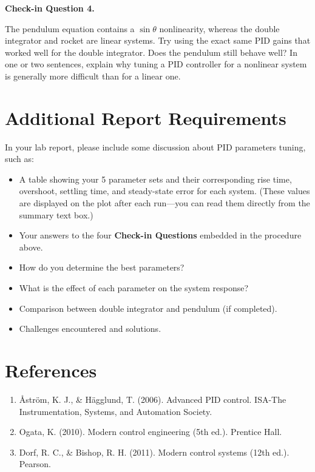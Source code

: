 \documentclass[12pt]{article}
\newenvironment{enroutequestion}[1]{%
    \begin{mdframed}[linewidth=1pt, linecolor=blue!60, backgroundcolor=blue!5,
                     innertopmargin=8pt, innerbottommargin=8pt,
                     innerleftmargin=10pt, innerrightmargin=10pt]
    \noindent\textbf{Check-in Question #1.}~\itshape
}{%
    \end{mdframed}
}
\begin{document}
\begin{enroutequestion}{4}
The pendulum equation contains a $\sin\theta$ nonlinearity, whereas the double integrator and rocket are linear systems.  Try using the exact same PID gains that worked well for the double integrator.  Does the pendulum still behave well?  In one or two sentences, explain why tuning a PID controller for a nonlinear system is generally more difficult than for a linear one.
\end{enroutequestion}

\section{Additional Report Requirements}

In your lab report, please include some discussion about PID parameters tuning, such as:
\begin{itemize}
    \item A table showing your 5 parameter sets and their corresponding rise time, overshoot, settling time, and steady-state error for each system.  (These values are displayed on the plot after each run---you can read them directly from the summary text box.)
    \item Your answers to the four \textbf{Check-in Questions} embedded in the procedure above.
    \item How do you determine the best parameters?  
    \item What is the effect of each parameter on the system response?  
    \item Comparison between double integrator and pendulum (if completed). 
    \item Challenges encountered and solutions. 
\end{itemize}

\section{References}

\begin{enumerate}
    \item Åström, K. J., \& Hägglund, T. (2006). Advanced PID control.  ISA-The Instrumentation, Systems, and Automation Society.
    \item Ogata, K. (2010). Modern control engineering (5th ed.). Prentice Hall.  
    \item Dorf, R. C., \& Bishop, R. H. (2011). Modern control systems (12th ed.). Pearson. 
\end{enumerate}
\end{document}
